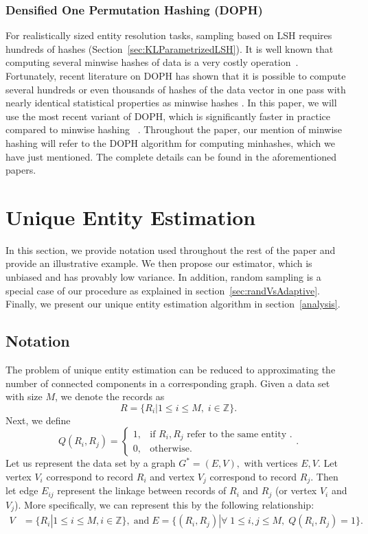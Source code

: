\documentclass{imsart}
\begin{document}
\subsubsection{Densified One Permutation Hashing (DOPH)}
For realistically sized entity resolution tasks, sampling based on LSH requires hundreds of hashes (Section~\ref{sec:KLParametrizedLSH}). It is well known that computing several minwise hashes of data is a very costly operation~\citep{li2012gpu}. Fortunately, recent literature on DOPH has shown that it is possible to compute several hundreds or even thousands of hashes of the data vector in one pass with nearly identical statistical properties as minwise hashes \citep{shrivastava2014densifying,shrivastava2014improved,shrivastava2017optimal}. In this paper, we will use the most recent variant of DOPH, which is significantly faster in practice compared to minwise hashing ~\citep{shrivastava2017optimal}. Throughout the paper, our mention of minwise hashing will refer to the DOPH algorithm for computing minhashes, which we have just mentioned. The complete details can be found in the aforementioned papers.


\section{Unique Entity Estimation}
\label{proposal}
In this section, we provide notation used throughout the rest of the paper and provide an illustrative example.
We then propose our estimator, which is unbiased and has provably low variance. In addition, random sampling is a special case of our procedure as explained in section~\ref{sec:randVsAdaptive}.  Finally, we present our unique entity estimation algorithm in section~\ref{analysis}.
\subsection{Notation}
\label{form}
The problem of unique entity estimation can be reduced to approximating the number of connected components in a corresponding graph.
%
Given a data set with size $M$, we denote the records as
$$R = \{R_i| 1\leq i \leq M, \; i \in \mathbb{Z}\}.$$
Next, we define
$$Q(R_i, R_j) =\begin{cases}
1, & \text{if $R_i, R_j$ refer to the same entity }.\\
0, & \text{otherwise}. \end{cases}.$$
Let us represent the data set by a graph $G^* = (E, V),$ with vertices $E,V.$ Let vertex $V_i$ correspond to record $R_i$ and vertex $V_j$ correspond to record $R_j$. Then let edge $E_{ij}$ represent the linkage between records of $R_i$ and $R_j$ (or
vertex $V_i$ and $V_j$). More specifically, we can represent this by the following relationship:
\begin{align*}
V &= \{R_i|1\leq i \leq M, i \in \mathbb{Z}\}, \; \text{and} \;
E = \{(R_i, R_j)| \forall\; 1\leq i, j \leq M, \; Q(R_i, R_j) = 1\}.
\end{align*}
\end{document}
